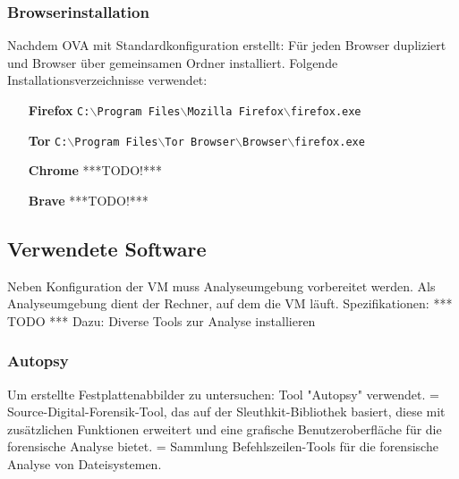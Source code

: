 \subsubsection*{Browserinstallation}
Nachdem OVA mit Standardkonfiguration erstellt: Für jeden Browser dupliziert und Browser über gemeinsamen Ordner installiert. Folgende Installationsverzeichnisse verwendet:
\begin{enumerate}
\item[\textbf{Firefox}] \texttt{C:$\backslash$Program Files$\backslash$Mozilla Firefox$\backslash$firefox.exe}
\item[\textbf{Tor}] \texttt{C:$\backslash$Program Files$\backslash$Tor Browser$\backslash$Browser$\backslash$firefox.exe}
\item[\textbf{Chrome}] ***TODO!***
\item[\textbf{Brave}] ***TODO!***
\end{enumerate}

\subsection*{Verwendete Software}
\label{subsection:methodik-vorbereitung-verwendetesoftware}
Neben Konfiguration der VM muss Analyseumgebung vorbereitet werden.
Als Analyseumgebung dient der Rechner, auf dem die VM läuft.
Spezifikationen: *** TODO ***
Dazu: Diverse Tools zur Analyse installieren

\subsubsection*{Autopsy}
\label{subsubsection:methodik-vorbereitung-verwendetesoftware-autopsy}
Um erstellte Festplattenabbilder zu untersuchen: Tool "Autopsy" verwendet.
= Source-Digital-Forensik-Tool, das auf der Sleuthkit-Bibliothek basiert, diese mit zusätzlichen Funktionen erweitert und eine grafische Benutzeroberfläche für die forensische Analyse bietet.  
= Sammlung Befehlszeilen-Tools für die forensische Analyse von Dateisystemen. 
 

